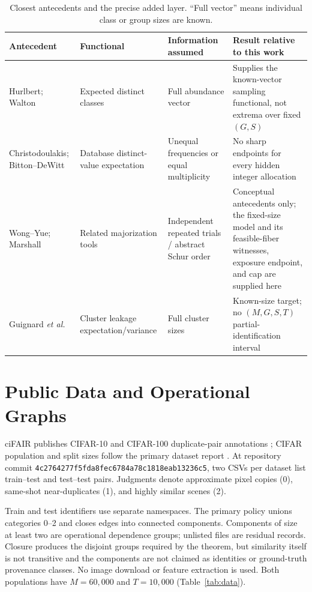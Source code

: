 \documentclass[conference,10pt]{IEEEtran}
\begin{document}
\begin{table}[t]
\caption{Closest antecedents and the precise added layer. ``Full vector'' means individual class or group sizes are known.}
\label{tab:antecedents}
\centering
\setlength{\tabcolsep}{4pt}
\begin{tabular}{p{}p{}p{}p{}}
\toprule
Antecedent & Functional & Information assumed & Result relative to this work\\
\midrule
Hurlbert; Walton \cite{hurlbert1971,walton1986} & Expected distinct classes & Full abundance vector & Supplies the known-vector sampling functional, not extrema over fixed $(G,S)$\\
Christodoulakis; Bitton--DeWitt \cite{christodoulakis1989,bitton1983} & Database distinct-value expectation & Unequal frequencies or equal multiplicity & No sharp endpoints for every hidden integer allocation\\
Wong--Yue; Marshall \cite{wong1973,marshall2011} & Related majorization tools & Independent repeated trials / abstract Schur order & Conceptual antecedents only; the fixed-size model and its feasible-fiber witnesses, exposure endpoint, and cap are supplied here\\
Guignard \emph{et al.} \cite{guignard2024} & Cluster leakage expectation/variance & Full cluster sizes & Known-size target; no $(M,G,S,T)$ partial-identification interval\\
\bottomrule
\end{tabular}
\end{table}

\section{Public Data and Operational Graphs}
ciFAIR publishes CIFAR-10 and CIFAR-100 duplicate-pair annotations \cite{barz2020,cifairmeta}; CIFAR population and split sizes follow the primary dataset report \cite{krizhevsky2009}. At repository commit \texttt{4c2764277f5fda8fec6784a78c1818eab13236c5}, two CSVs per dataset list train--test and test--test pairs. Judgments denote approximate pixel copies (0), same-shot near-duplicates (1), and highly similar scenes (2).

Train and test identifiers use separate namespaces. The primary policy unions categories 0--2 and closes edges into connected components. Components of size at least two are operational dependence groups; unlisted files are residual records. Closure produces the disjoint groups required by the theorem, but similarity itself is not transitive and the components are not claimed as identities or ground-truth provenance classes. No image download or feature extraction is used. Both populations have $M=60{,}000$ and $T=10{,}000$ (Table~\ref{tab:data}).
\end{document}
